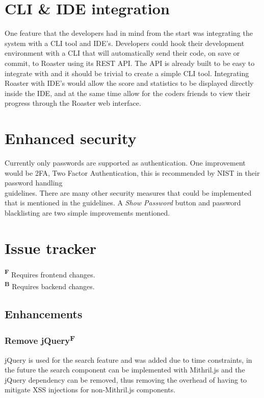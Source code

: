 \documentclass[12pt,a4paper]{report}
\begin{document}
\section{CLI \& IDE integration}
One feature that the developers had in mind from the start was integrating the system with a CLI tool and IDE's. Developers could hook their development environment with a CLI that will automatically send their code, on save or commit, to Roaster using its REST API. The API is already built to be easy to integrate with and it should be trivial to create a simple CLI tool. Integrating Roaster with IDE's would allow the score and statistics to be displayed directly inside the IDE, and at the same time allow for the coders friends to view their progress through the Roaster web interface.

\section{Enhanced security}
Currently only passwords are supported as authentication. One improvement would be 2FA, Two Factor Authentication, this is recommended by NIST in their password handling \\ guidelines\cite{nist-passwords}. There are many other security measures that could be implemented that is mentioned in the guidelines. A \textit{Show Password} button and password blacklisting are two simple improvements mentioned\cite{oauth-nist}.

\section{Issue tracker}
\label{sec:issue-tracker}
\textbf{\textsuperscript{F}} Requires frontend changes. \\
\textbf{\textsuperscript{B}} Requires backend changes.

\subsection*{Enhancements}
\subsubsection{Remove jQuery\texorpdfstring{\textsuperscript{F}}{}}
\label{subsec:remove-jquery}
jQuery is used for the search feature and was added due to time constraints, in the future the search component can be implemented with Mithril.js and the jQuery dependency can be removed, thus removing the overhead of having to mitigate XSS injections for non-Mithril.js components.
\end{document}

